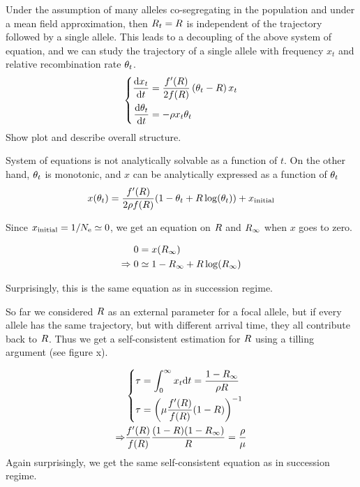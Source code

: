 \documentclass{article}
\begin{document}
Under the assumption of many alleles co-segregating in the population and under a mean field approximation, then $R_{t}=R$ is independent of the trajectory followed by a single allele. This leads to a decoupling of the above system of equation, and we can study the trajectory of a single allele with frequency $x_{t}$ and relative recombination rate $\theta _{t}$.
\begin{equation}
\left\{
      \begin{aligned}
          \dfrac{\mathrm{d} x_{t}}{\mathrm{d} t} &= \dfrac{f'(R )}{2 f(R )} \left( \theta_{t}  - R \right) x_{t} \\
        \dfrac{\mathrm{d} \theta_{t}}{\mathrm{d} t} &= 
        - \rho x_{t} \theta_{t} \\
      \end{aligned}
\right.
\end{equation}
Show plot and describe overall structure.

System of equations is not analytically solvable as a function of $t$. On the other hand, $\theta_{t}$ is monotonic, and $x$ can be analytically expressed as a function of $\theta_{t}$
\begin{equation}
x(\theta_{t} ) =\dfrac{f'(R)}{2 \rho f(R )} (1- \theta_{t}  + R  \operatorname{log}(\theta_{t} )) + x_{\mathrm{initial}}
\end{equation}

Since $x_{\mathrm{initial}} = 1 / N_\mathrm{e} \simeq 0$, we get an equation on $R$ and ${R_{\infty}}$ when $x$ goes to zero.

\begin{align}
 	0 &=  x({R_{\infty}}) \\
   \Rightarrow 0 &\simeq  1-{R_{\infty}}  + R  \operatorname{log}({R_{\infty}} ) 
\end{align}

Surprisingly, this is the same equation as in succession regime.

So far we considered $R$ as an external parameter for a focal allele, but if every allele has the same trajectory, but with different arrival time, they all contribute back to $R$. Thus we get a self-consistent estimation for  $R$ using a tilling argument (see figure x). 

\begin{align} 
  & \left\{
  \begin{aligned}
    \tau &= \int_{0}^{\infty } x_{t} \mathrm{d}  t = \dfrac{1 - {R_{\infty}} }{\rho R } \\
    \tau &= \left( \mu \dfrac{f'(R )}{f(R )} (1-R )  \right)^{-1}
  \end{aligned}
  \right. \\
   \Rightarrow &
    \dfrac{f'(R )}{f(R )} \dfrac{(1- R )(1- {R_{\infty}} )}{R } = \dfrac{\rho}{ \mu}
\end{align}
Again surprisingly, we get the same self-consistent equation as in succession regime.
\end{document}

